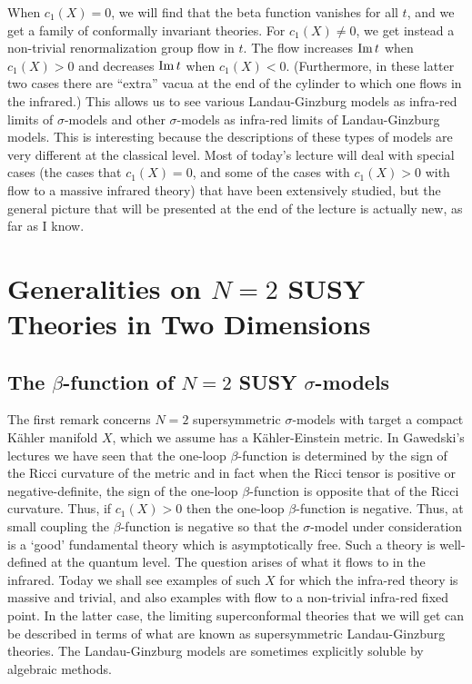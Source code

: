 When $c_1(X)=0$, we will find that the beta function vanishes for
all $t$, and we  get a family of conformally
invariant theories.   For $c_1(X)\not= 0$, we get instead
a non-trivial renormalization group flow in $t$.
The flow  increases ${\rm Im}\, t$  when $c_1(X)>0$ and
decreases ${\rm Im}\, t$ when $c_1(X)<0$. (Furthermore, in these latter two
cases there are ``extra'' vacua at the  end of the cylinder to which one
flows in the infrared.)  This allows
us to see various
Landau-Ginzburg models as infra-red limits of $\sigma$-models and
other $\sigma$-models as infra-red limits of Landau-Ginzburg  models.
This is interesting because the descriptions of these types of models
are very different at the classical level.   Most of today's lecture
will deal with special cases
(the cases that $c_1(X)=0$, and some of the cases with
$c_1(X)>0$ with flow to a massive infrared theory) that have been extensively
studied, but the general picture that  will be presented
at the end of the lecture is actually new, as far as I know.


\section{Generalities on $N=2$ SUSY Theories in Two Dimensions}

\subsection{The  $\beta$-function of $N=2$ SUSY $\sigma$-models}

The first remark concerns $N=2$ supersymmetric $\sigma$-models with target a
compact K\"ahler manifold $X$, which we assume has a K\"ahler-Einstein
metric. In Gawedski's lectures we have seen that the one-loop
$\beta$-function is determined by the sign of the Ricci curvature of
the metric
and in fact when the Ricci tensor is positive or negative-definite, the sign
of the one-loop $\beta$-function is opposite that of the Ricci curvature.
Thus,
if $c_1(X)>0$ then the one-loop $\beta$-function is negative.
Thus, at small coupling the $\beta$-function is negative  so that the
$\sigma$-model under consideration is a
`good'  fundamental theory which is
asymptotically free. Such a theory is well-defined at the quantum level.
The question arises of what it flows to in the infrared.
Today we shall see examples of
such $X$ for which the infra-red
theory is massive and trivial, and also examples with flow to a non-trivial
infra-red fixed point.
In the latter case, the
limiting superconformal theories that we will get can be
 described in terms of what are known as
supersymmetric Landau-Ginzburg theories.
The Landau-Ginzburg models are sometimes
explicitly soluble by algebraic methods.

